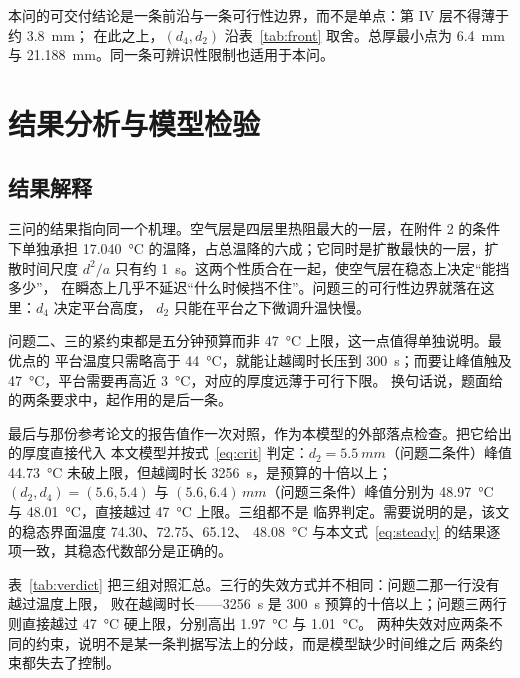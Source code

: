 \documentclass[withoutpreface,bwprint]{cumcmthesis}
\begin{document}
本问的可交付结论是一条前沿与一条可行性边界，而不是单点：第 IV 层不得薄于约 \SI{3.8}{mm}；
在此之上，$(d_4,d_2)$ 沿表~\ref{tab:front} 取舍。总厚最小点为 \SI{6.4}{mm} 与
\SI{21.188}{mm}。同一条可辨识性限制也适用于本问。

\section{结果分析与模型检验}
\label{mcm-q3-end}

\subsection{结果解释}

三问的结果指向同一个机理。空气层是四层里热阻最大的一层，在附件 2 的条件下单独承担
\SI{17.040}{\celsius} 的温降，占总温降的六成；它同时是扩散最快的一层，扩散时间尺度
$d^2/a$ 只有约 \SI{1}{s}。这两个性质合在一起，使空气层在稳态上决定“能挡多少”，
在瞬态上几乎不延迟“什么时候挡不住”。问题三的可行性边界就落在这里：$d_4$ 决定平台高度，
$d_2$ 只能在平台之下微调升温快慢。

问题二、三的紧约束都是五分钟预算而非 \SI{47}{\celsius} 上限，这一点值得单独说明。最优点的
平台温度只需略高于 \SI{44}{\celsius}，就能让越阈时长压到 \SI{300}{s}；而要让峰值触及
\SI{47}{\celsius}，平台需要再高近 \SI{3}{\celsius}，对应的厚度远薄于可行下限。
换句话说，题面给的两条要求中，起作用的是后一条。

最后与那份参考论文的报告值作一次对照，作为本模型的外部落点检查。把它给出的厚度直接代入
本文模型并按式~\eqref{eq:crit} 判定：$d_2=\SI{5.5}{mm}$（问题二条件）峰值
\SI{44.73}{\celsius} 未破上限，但越阈时长 \SI{3256}{s}，是预算的十倍以上；
$(d_2,d_4)=(5.6,5.4)$ 与 $(5.6,6.4)\,\si{mm}$（问题三条件）峰值分别为
\SI{48.97}{\celsius} 与 \SI{48.01}{\celsius}，直接越过 \SI{47}{\celsius} 上限。三组都不是
临界判定。需要说明的是，该文的稳态界面温度 \num{74.30}、\num{72.75}、\num{65.12}、
\SI{48.08}{\celsius} 与本文式~\eqref{eq:steady} 的结果逐项一致，其稳态代数部分是正确的。

表~\ref{tab:verdict} 把三组对照汇总。三行的失效方式并不相同：问题二那一行没有越过温度上限，
败在越阈时长——\SI{3256}{s} 是 \SI{300}{s} 预算的十倍以上；问题三两行则直接越过
\SI{47}{\celsius} 硬上限，分别高出 \SI{1.97}{\celsius} 与 \SI{1.01}{\celsius}。
两种失效对应两条不同的约束，说明不是某一条判据写法上的分歧，而是模型缺少时间维之后
两条约束都失去了控制。

\begin{table}[htbp]
  \centering
  \caption{参考论文报告厚度代入本文模型后的判定}
  \label{tab:verdict}
  
\end{table}
\end{document}
